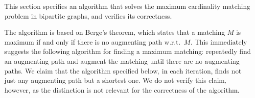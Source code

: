 %
\begin{isabellebody}%
%
%
\isadelimdocument
%
\endisadelimdocument
%
\isatagdocument
%
\isamarkuptrue%
%
\endisatagdocument
{\isafolddocument}%
%
\isadelimdocument
%
\endisadelimdocument
%
\begin{isamarkuptext}%
This section specifies an algorithm that solves the maximum cardinality matching problem in
bipartite graphs, and verifies its correctness.

The algorithm is based on Berge's theorem, which states that a matching $M$ is maximum if and only
if there is no augmenting path w.r.t.\ $M$. This immediately suggests the following algorithm for
finding a maximum matching: repeatedly find an augmenting path and augment the matching until there
are no augmenting paths. We claim that the algorithm specified below, in each iteration, finds not
just any augmenting path but a shortest one. We do not verify this claim, however, as the
distinction is not relevant for the correctness of the algorithm.


\end{isamarkuptext}
\end{isabellebody}
